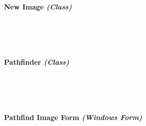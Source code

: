 \begin{FlushLeft}
    \bk

    \pagebreak
\paragraph{New Image \textit{(Class)}} \mbox{} \\

    \begin{figure}[H]
        \centering
    \end{figure}\\

    \bk

    \pagebreak
\paragraph{Pathfinder \textit{(Class)}} \mbox{} \\

    \begin{figure}[H]
        \centering
    \end{figure}\\

    \bk

    \pagebreak
\paragraph{Pathfind Image Form \textit{(Windows Form)}} \mbox{} \\


\end{FlushLeft}
